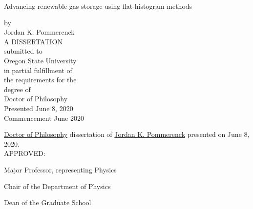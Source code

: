 \newpage{}
\thispagestyle{empty}
\singlespacing

\begin{center}
Advancing renewable gas storage using flat-histogram methods

\vspace{1.0cm}
by \\
Jordan K. Pommerenck \\
\vspace{3.0cm}
A DISSERTATION \\
\vspace{0.5cm}
submitted to \\
\vspace{0.5cm}
Oregon State University \\
\vspace{3.0cm}
in partial fulfillment of \\
the requirements for the \\
degree of \\
\vspace{1.0cm}
Doctor of Philosophy \\
\vspace{3.0cm}
Presented June 8, 2020  \\
Commencement June 2020
\end{center}

\newpage{}
\thispagestyle{empty}
\singlespacing
\justify{}
\underline{Doctor of Philosophy} dissertation of \underline{Jordan K. Pommerenck} presented on
June 8, 2020. \\

\justify{}
\vspace{0.5cm}
APPROVED: \\

\justify{}
\underline{\hspace{15cm}}
\begin{flushleft}
Major Professor, representing Physics
\vspace{1.0cm}
\end{flushleft}

\justify{}
\underline{\hspace{15cm}}
\begin{flushleft}
Chair of the Department of Physics
\vspace{1.0cm}
\end{flushleft}

\justify{}
\underline{\hspace{15cm}}
\begin{flushleft}
Dean of the Graduate School
\vspace{1.0cm}
\end{flushleft}

